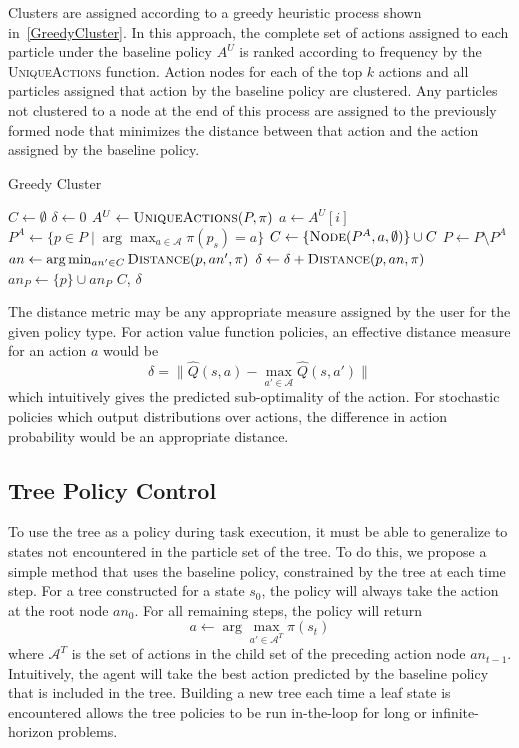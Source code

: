 \documentclass[letterpaper]{article} %
\begin{document}
Clusters are assigned according to a greedy heuristic process shown in~\cref{GreedyCluster}.
In this approach, the complete set of actions assigned to each particle under the baseline policy $A^U$ is ranked according to frequency by the \textsc{UniqueActions} function.
Action nodes for each of the top $k$ actions and all particles assigned that action by the baseline policy are clustered.
Any particles not clustered to a node at the end of this process are assigned to the previously formed node that minimizes the distance between that action and the action assigned by the baseline policy.
\begin{algorithm}[ht]
\caption{Greedy Cluster}\label{GreedyCluster}
\begin{algorithmic}[1]
\State $C \gets \emptyset$
\State $\delta \gets 0$
\State $A^U \gets \textsc{UniqueActions}(P, \pi)$
\State $a \gets A^U[i]$
\State $P^A \gets \{ p \in P \mid \arg\max_{a \in \mathcal{A}}\pi(p_s) = a \}$
\State $C \gets \{ \textsc{Node}(P^A, a, \emptyset) \} \cup C$
\State $P \gets P \setminus P^A$
\EndFor
{}
\State $an \gets \arg\min_{an' \in C} \textsc{Distance}(p, an', \pi)$
\State $\delta \gets \delta + \textsc{Distance}(p, an, \pi)$
\State $an_P \gets \{ p \} \cup an_P$
\EndFor
\State \Return $C$, $\delta$
\EndProcedure
\end{algorithmic}
\end{algorithm}

The distance metric may be any appropriate measure assigned by the user for the given policy type.
For action value function policies, an effective distance measure for an action $a$ would be
\begin{equation}\label{eq: delta dqn}
\delta = \| \hat{Q}(s, a) - \max_{a' \in \mathcal{A}} \hat{Q}(s, a') \|
\end{equation}
which intuitively gives the predicted sub-optimality of the action.
For stochastic policies which output distributions over actions, the difference in action probability would be an appropriate distance.

\subsection{Tree Policy Control}\label{sec: tree execution}
To use the tree as a policy during task execution, it must be able to generalize to states not encountered in the particle set of the tree.
To do this, we propose a simple method that uses the baseline policy, constrained by the tree at each time step.
For a tree constructed for a state $s_0$, the policy will always take the action at the root node $an_0$.
For all remaining steps, the policy will return
\begin{equation}
a \gets \arg\max_{a' \in \mathcal{A}^T} \pi(s_t)
\end{equation}
where $\mathcal{A}^T$ is the set of actions in the child set of the preceding action node $an_{t-1}$.
Intuitively, the agent will take the best action predicted by the baseline policy that is included in the tree.
Building a new tree each time a leaf state is encountered allows the tree policies to be run in-the-loop for long or infinite-horizon problems.
\end{document}
